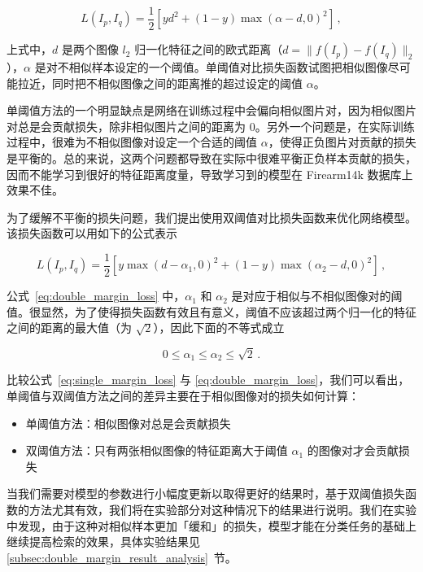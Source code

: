 \begin{equation}\label{eq:single_margin_loss}
L(I_p, I_q) = \frac{1}{2}\left[yd^2 + (1-y)\max(\alpha - d, 0)^2\right]\, ,
\end{equation}

上式中，$d$ 是两个图像 $l_2$ 归一化特征之间的欧式距离（$d= \lVert f(I_p)-f(I_q)\rVert_2$），$\alpha$ 是对不相似样本设定的一个阈值。单阈值对比损失函数试图把相似图像尽可能拉近，同时把不相似图像之间的距离推的超过设定的阈值 $\alpha$。

单阈值方法的一个明显缺点是网络在训练过程中会偏向相似图片对，因为相似图片对总是会贡献损失，除非相似图片之间的距离为 0。另外一个问题是，在实际训练过程中，很难为不相似图像对设定一个合适的阈值 $\alpha$，使得正负图片对贡献的损失是平衡的。总的来说，这两个问题都导致在实际中很难平衡正负样本贡献的损失，因而不能学习到很好的特征距离度量，导致学习到的模型在 Firearm14k 数据库上效果不佳。

为了缓解不平衡的损失问题，我们提出使用双阈值对比损失函数来优化网络模型。该损失函数可以用如下的公式表示

\begin{equation}\label{eq:double_margin_loss}
L(I_p, I_q) = \frac{1}{2}[y\max(d - {\alpha}_1, 0)^2 + (1-y)\max({\alpha}_2 - d, 0)^2]\, ,
\end{equation}

公式~\ref{eq:double_margin_loss} 中，$\alpha_1$ 和 $\alpha_2$ 是对应于相似与不相似图像对的阈值。很显然，为了使得损失函数有效且有意义，阈值不应该超过两个归一化的特征之间的距离的最大值（为 $\sqrt{2}$），因此下面的不等式成立

\begin{equation}
0 \leq \alpha_1 \leq \alpha_2 \leq \sqrt{2}\, .
\end{equation}

比较公式~\ref{eq:single_margin_loss} 与 \ref{eq:double_margin_loss}，我们可以看出，单阈值与双阈值方法之间的差异主要在于相似图像对的损失如何计算：

\begin{itemize}
\item 单阈值方法：相似图像对总是会贡献损失
\item 双阈值方法：只有两张相似图像的特征距离大于阈值 $\alpha_1$ 的图像对才会贡献损失
\end{itemize}


当我们需要对模型的参数进行小幅度更新以取得更好的结果时，基于双阈值损失函数的方法尤其有效，我们将在实验部分对这种情况下的结果进行说明。我们在实验中发现，由于这种对相似样本更加「缓和」的损失，模型才能在分类任务的基础上继续提高检索的效果，具体实验结果见 \ref{subsec:double_margin_result_analysis}~节。

